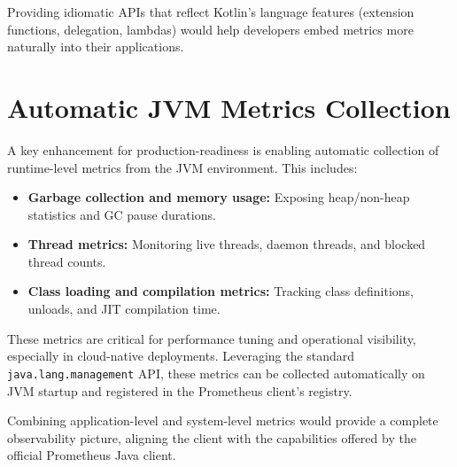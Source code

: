 Providing idiomatic APIs that reflect Kotlin’s language features (extension functions, delegation, lambdas) would help developers embed metrics more naturally into their applications.

\section{Automatic JVM Metrics Collection}
A key enhancement for production-readiness is enabling automatic collection of runtime-level metrics from the JVM environment. This includes:
\begin{itemize}
    \item \textbf{Garbage collection and memory usage:} Exposing heap/non-heap statistics and GC pause durations.
    \item \textbf{Thread metrics:} Monitoring live threads, daemon threads, and blocked thread counts.
    \item \textbf{Class loading and compilation metrics:} Tracking class definitions, unloads, and JIT compilation time.
\end{itemize}

These metrics are critical for performance tuning and operational visibility, especially in cloud-native deployments. Leveraging the standard \texttt{java.lang.management} API, these metrics can be collected automatically on JVM startup and registered in the Prometheus client’s registry.

Combining application-level and system-level metrics would provide a complete observability picture, aligning the client with the capabilities offered by the official Prometheus Java client.
